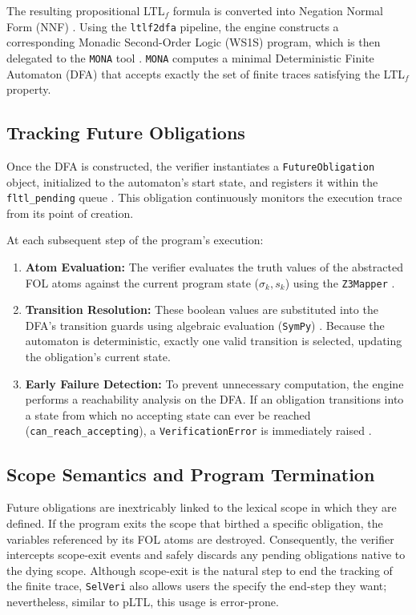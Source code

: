 \documentclass{article}
\begin{document}
The resulting propositional LTL$_f$ formula is converted into Negation Normal Form (NNF) %
. Using the \texttt{ltlf2dfa} pipeline, the engine constructs a corresponding Monadic Second-Order Logic (WS1S) program, which is then delegated to the \texttt{MONA} tool \cite{henriksen1995mona} %
. \texttt{MONA} computes a minimal Deterministic Finite Automaton (DFA) that accepts exactly the set of finite traces satisfying the LTL$_f$ property.

\subsection{Tracking Future Obligations}
Once the DFA is constructed, the verifier instantiates a \texttt{FutureObligation} object, initialized to the automaton's start state, and registers it within the \texttt{fltl\_pending} queue %
. This obligation continuously monitors the execution trace from its point of creation.

At each subsequent step of the program's execution:
\begin{enumerate}
    \item \textbf{Atom Evaluation:} The verifier evaluates the truth values of the abstracted FOL atoms against the current program state ($\sigma_k, s_k$) using the \texttt{Z3Mapper} %
.
    \item \textbf{Transition Resolution:} These boolean values are substituted into the DFA's transition guards using algebraic evaluation (\texttt{SymPy}) %
. Because the automaton is deterministic, exactly one valid transition is selected, updating the obligation's current state.
    \item \textbf{Early Failure Detection:} To prevent unnecessary computation, the engine performs a reachability analysis on the DFA. If an obligation transitions into a state from which no accepting state can ever be reached (\texttt{can\_reach\_accepting}), a \texttt{VerificationError} is immediately raised %
.
\end{enumerate}

\subsection{Scope Semantics and Program Termination}
Future obligations are inextricably linked to the lexical scope in which they are defined. If the program exits the scope that birthed a specific obligation, the variables referenced by its FOL atoms are destroyed. Consequently, the verifier intercepts scope-exit events and safely discards any pending obligations native to the dying scope. Although scope-exit is the natural step to end the tracking of the finite trace, \texttt{SelVeri} also allows users the specify the end-step they want; nevertheless, similar to pLTL, this usage is error-prone.
\end{document}
